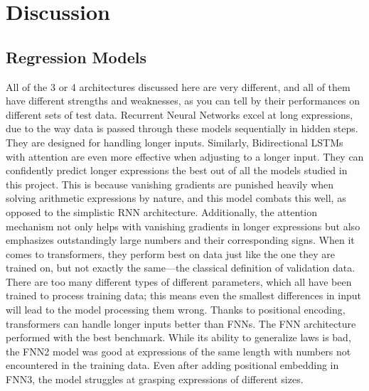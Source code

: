 \documentclass{article}
\begin{document}
\section{Discussion}
\subsection{Regression Models}
All of the 3 or 4 architectures discussed here are very different, and all of them have different strengths and weaknesses, as you can tell by their performances on different sets of test data. Recurrent Neural Networks excel at long expressions, due to the way data is passed through these models sequentially in hidden steps. They are designed for handling longer inputs. Similarly, Bidirectional LSTMs with attention are even more effective when adjusting to a longer input. They can confidently predict longer expressions the best out of all the models studied in this project. This is because vanishing gradients are punished heavily when solving arithmetic expressions by nature, and this model combats this well, as opposed to the simplistic RNN architecture. Additionally, the attention mechanism not only helps with vanishing gradients in longer expressions but also emphasizes outstandingly large numbers and their corresponding signs. When it comes to transformers, they perform best on data just like the one they are trained on, but not exactly the same—the classical definition of validation data. There are too many different types of different parameters, which all have been trained to process training data; this means even the smallest differences in input will lead to the model processing them wrong. Thanks to positional encoding, transformers can handle longer inputs better than FNNs. The FNN architecture performed with the best benchmark. While its ability to generalize laws is bad, the FNN2 model was good at expressions of the same length with numbers not encountered in the training data. Even after adding positional embedding in FNN3, the model struggles at grasping expressions of different sizes.
\end{document}
